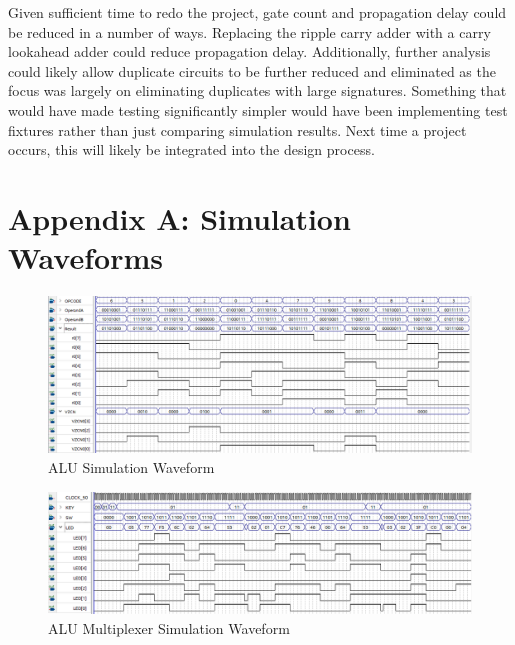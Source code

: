 \documentclass[12pt,letterpaper,titlepage]{article}
\begin{document}
\begin{raggedright}
Given sufficient time to redo the project, gate count and propagation delay could be reduced in a number of ways. Replacing the ripple carry adder with a carry lookahead adder could reduce propagation delay. Additionally, further analysis could likely allow duplicate circuits to be further reduced and eliminated as the focus was largely on eliminating duplicates with large signatures. Something that would have made testing significantly simpler would have been implementing test fixtures rather than just comparing simulation results. Next time a project occurs, this will likely be integrated into the design process.
\clearpage

\section{Appendix A: Simulation Waveforms}
\label{simwave}
\begin{figure}[ht]
\centering
\includegraphics[width=\textwidth, height=\textheight, keepaspectratio=true]{valsimalu}
\caption{ALU Simulation Waveform}\label{alusim}
\end{figure}


\begin{figure}[ht]
\centering
\includegraphics[width=\textwidth, height=\textheight, keepaspectratio=true]{valsim}
\caption{ALU Multiplexer Simulation Waveform}\label{alumuxsim}
\end{figure}
\clearpage


\end{raggedright}
\end{document}
